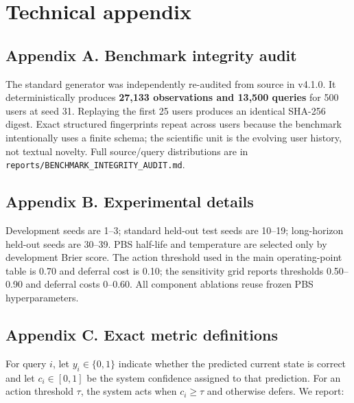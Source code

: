 \section{Technical appendix}\label{technical-appendix}

\subsection{Appendix A. Benchmark integrity
audit}\label{appendix-a.-benchmark-integrity-audit}

The standard generator was independently re-audited from source in
v4.1.0. It deterministically produces \textbf{27,133 observations and
13,500 queries} for 500 users at seed 31. Replaying the first 25 users
produces an identical SHA-256 digest. Exact structured fingerprints
repeat across users because the benchmark intentionally uses a finite
schema; the scientific unit is the evolving user history, not textual
novelty. Full source/query distributions are in
\texttt{reports/BENCHMARK\_INTEGRITY\_AUDIT.md}.

\subsection{Appendix B. Experimental
details}\label{appendix-b.-experimental-details}

Development seeds are 1--3; standard held-out test seeds are 10--19;
long-horizon held-out seeds are 30--39. PBS half-life and temperature
are selected only by development Brier score. The action threshold used
in the main operating-point table is 0.70 and deferral cost is 0.10; the
sensitivity grid reports thresholds 0.50--0.90 and deferral costs
0--0.60. All component ablations reuse frozen PBS hyperparameters.

\subsection{Appendix C. Exact metric
definitions}\label{appendix-c.-exact-metric-definitions}

For query \(i\), let \(y_i\in\{0,1\}\) indicate whether the predicted
current state is correct and let \(c_i\in[0,1]\) be the system
confidence assigned to that prediction. For an action threshold
\(\tau\), the system acts when \(c_i\ge\tau\) and otherwise defers. We
report:

